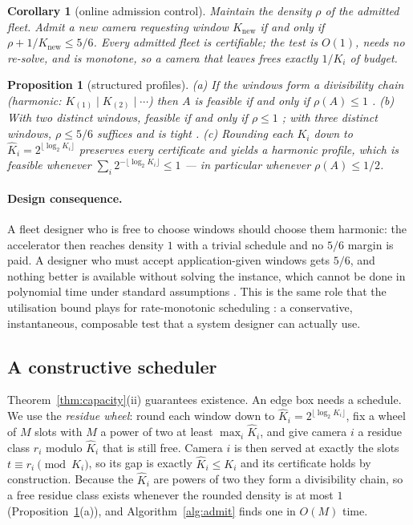 \documentclass[final,5p,times,twocolumn]{elsarticle}
\newtheorem{proposition}[theorem]{Proposition}
\newtheorem{corollary}[theorem]{Corollary}
\theoremstyle{definition}
\newcommand{\Ki}{K_i}
\newcommand{\dens}{\rho}
\begin{document}
\begin{corollary}[online admission control]\label{cor:admission}
Maintain the density $\dens$ of the admitted fleet. Admit a new camera requesting window
$K_{\mathrm{new}}$ if and only if $\dens+1/K_{\mathrm{new}}\le5/6$. Every admitted fleet is
certifiable; the test is $O(1)$, needs no re-solve, and is monotone, so a camera that leaves
frees exactly $1/\Ki$ of budget.
\end{corollary}

\begin{proposition}[structured profiles]\label{prop:structured}
(a) If the windows form a divisibility chain (\emph{harmonic}: $K_{(1)}\mid K_{(2)}\mid\cdots$)
then $A$ is feasible if and only if $\dens(A)\le1$ \cite{holte1989pinwheel}.
(b) With two distinct windows, feasible if and only if $\dens\le1$ \cite{holte1992two}; with three
distinct windows, $\dens\le5/6$ suffices and is tight \cite{linlin1997three}.
(c) Rounding each $\Ki$ \emph{down} to $\hat K_i=2^{\lfloor\log_2\Ki\rfloor}$ preserves every
certificate and yields a harmonic profile, which is feasible whenever
$\sum_i 2^{-\lfloor\log_2\Ki\rfloor}\le1$ --- in particular whenever $\dens(A)\le1/2$.
\end{proposition}

\paragraph{Design consequence.} A fleet designer who is free to choose windows should choose them
harmonic: the accelerator then reaches density $1$ with a trivial schedule and no $5/6$ margin is
paid. A designer who must accept application-given windows gets $5/6$, and nothing better is
available without solving the instance, which cannot be done in polynomial time under standard
assumptions \cite{kobayashi2026tcs}. This is the same role that the utilisation bound plays for
rate-monotonic scheduling \cite{liulayland1973}: a conservative, instantaneous, composable test
that a system designer can actually use.

\subsection{A constructive scheduler}\label{sec:constructive}
Theorem~\ref{thm:capacity}(ii) guarantees existence. An edge box needs a schedule. We use the
\emph{residue wheel}: round each window down to $\hat K_i=2^{\lfloor\log_2 K_i\rfloor}$, fix a
wheel of $M$ slots with $M$ a power of two at least $\max_i\hat K_i$, and give camera $i$ a
residue class $r_i$ modulo $\hat K_i$ that is still free. Camera $i$ is then served at exactly the
slots $t\equiv r_i \pmod{\hat K_i}$, so its gap is exactly $\hat K_i\le K_i$ and its certificate
holds by construction. Because the $\hat K_i$ are powers of two they form a divisibility chain, so
a free residue class exists whenever the rounded density is at most $1$
(Proposition~\ref{prop:structured}(a)), and Algorithm~\ref{alg:admit} finds one in $O(M)$ time.
\end{document}
